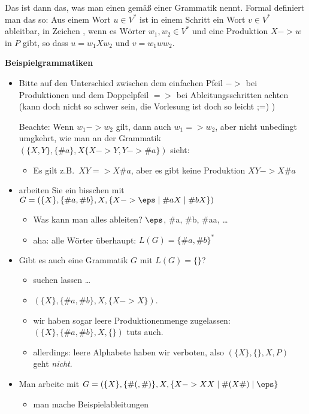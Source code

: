 Das ist dann das, was man einen
 gemäß einer
Grammatik nennt. Formal definiert man das so: Aus einem Wort $u\in
V^*$ ist in einem Schritt ein Wort $v\in V^*$ ableitbar, in Zeichen
, wenn es Wörter $w_1,w_2\in V^*$ und eine Produktion
$X->w$ in $P$ gibt, so dass $u=w_1Xw_2$ und $v=w_1ww_2$.
%
\begin{tutorium}
  \noindent
  \textbf{Beispielgrammatiken}
  \begin{itemize}
  \item Bitte auf den Unterschied zwischen dem einfachen Pfeil $->$
    bei Produktionen und dem Doppelpfeil $=>$ bei Ableitungsschritten
    achten (kann doch nicht so schwer sein, die Vorlesung ist doch so
    leicht ;=) )

    Beachte: Wenn $w_1->w_2$ gilt, dann auch $w_1=>w_2$, aber nicht
    unbedingt umgkehrt, wie man an der Grammatik $(\{X,Y\}, \{\#a\}, X
    \{X->Y, Y->\#a\})$ sieht:
    \begin{itemize}
    \item Es gilt z.B.\ $XY=> X\#a$, aber es gibt keine Produktion
      $XY-> X\#a$
    \end{itemize}
  \item arbeiten Sie ein bisschen mit $G=(\{X\}, \{\#a, \#b\}, X, \{X
    -> \eps \;|\; \#aX \;|\; \#bX \})$
    \begin{itemize}
    \item Was kann man alles ableiten? $\eps$, \#a, \#b, \#{aa}, \dots
    \item aha: alle Wörter überhaupt: $L(G)=\{\#a, \#b\}^*$
    \end{itemize}
  \item Gibt es auch eine Grammatik $G$ mit  $L(G)=\{\}$?
    \begin{itemize}
    \item suchen lassen \dots
    \item \zB $(\{X\}, \{\#a, \#b\}, X, \{X -> X\})$.
    \item wir haben sogar leere Produktionenmenge zugelassen: $(\{X\},
      \{\#a, \#b\}, X, \{\})$ tuts auch.
    \item allerdings: leere Alphabete haben wir verboten, also $(\{X\},
      \{ \}, X, P)$ geht \emph{nicht}.
    \end{itemize}
  \item Man arbeite mit $G=(\{X\}, \{ \#(, \#)\}, X, \{X -> XX
    \;|\; \#( X \#) \;|\; \eps \}$
    \begin{itemize}
    \item man mache Beispielableitungen

\end{itemize}
\end{itemize}
\end{tutorium}
